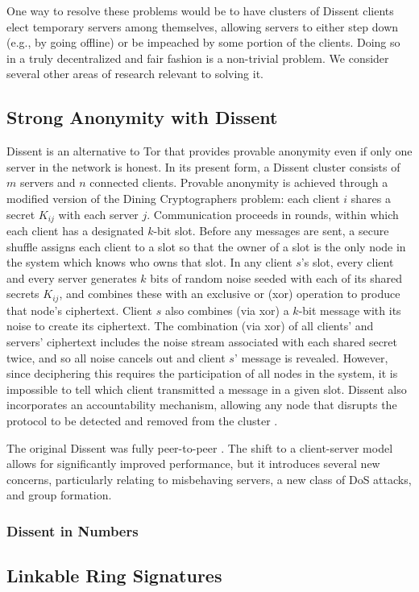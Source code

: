     One way to resolve these problems would be to have clusters of Dissent
    clients elect temporary servers among themselves, allowing servers to either
    step down (e.g., by going offline) or be impeached by some portion of the
    clients.  Doing so in a truly decentralized and fair fashion is a
    non-trivial problem.  We consider several other areas of research relevant
    to solving it.

\subsection{Strong Anonymity with Dissent}
  \label{Subsection:Dissent}
    Dissent is an alternative to Tor that provides provable anonymity even if
    only one server in the network is honest\cite{corrigan-gibbs_dissent:_2010}.
    In its present form, a Dissent cluster consists of $m$ servers and $n$
    connected clients\cite{wolinsky_dissent_2012}. Provable anonymity is
    achieved through a modified version of the Dining Cryptographers
    problem\cite{chaum_dining_1988}: each client $i$ shares a secret $K_{ij}$
    with each server $j$. Communication proceeds in rounds, within which each
    client has a designated $k$-bit slot.  Before any messages are sent, a
    secure shuffle\cite{neff_verifiable_2001} assigns each client to a slot so
    that the owner of a slot is the only node in the system which knows who owns
    that slot.  In any client $s$'s slot, every client and every server
    generates $k$ bits of random noise seeded with each of its shared secrets
    $K_{ij}$, and combines these with an exclusive or (xor) operation to produce
    that node's ciphertext. Client $s$ also combines (via xor) a $k$-bit message
    with its noise to create its ciphertext. The combination (via xor) of all
    clients' and servers' ciphertext includes the noise stream associated with
    each shared secret twice, and so all noise cancels out and client $s$'
    message is revealed. However, since deciphering this requires the
    participation of all nodes in the system, it is impossible to tell which
    client transmitted a message in a given slot. Dissent also incorporates an
    accountability mechanism, allowing any node that disrupts the protocol to be
    detected and removed from the cluster
    \cite{corrigan-gibbs_proactively_2013}.

    The original Dissent was fully peer-to-peer
    \cite{corrigan-gibbs_dissent:_2010}. The shift to a client-server model
    allows for significantly improved performance, but it introduces several new
    concerns, particularly relating to misbehaving servers, a new class of DoS
    attacks, and group formation.

      \subsubsection{Dissent in Numbers}
    \subsection{Linkable Ring Signatures}

